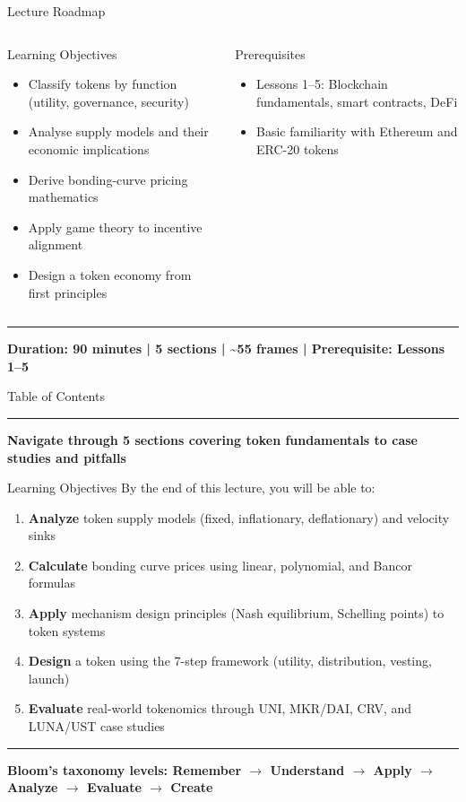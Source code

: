 \documentclass[8pt,aspectratio=169]{beamer}
\newcommand{\bottomnote}[1]{\vfill\vspace{-2mm}\textcolor{mllavender2}{\rule{\textwidth}{0.4pt}}\vspace{1mm}\footnotesize\textbf{#1}}
\begin{document}
\begin{frame}{Lecture Roadmap}
\begin{columns}[T]
\begin{block}{Learning Objectives}
\footnotesize
\begin{itemize}
  \item Classify tokens by function (utility, governance, security)
  \item Analyse supply models and their economic implications
  \item Derive bonding-curve pricing mathematics
  \item Apply game theory to incentive alignment
  \item Design a token economy from first principles
\end{itemize}
\end{block}
\vspace{1mm}
\begin{block}{Prerequisites}
\footnotesize
\begin{itemize}
  \item Lessons 1--5: Blockchain fundamentals, smart contracts, DeFi
  \item Basic familiarity with Ethereum and ERC-20 tokens
\end{itemize}
\end{block}
\end{columns}
\bottomnote{Duration: 90 minutes | 5 sections | \textasciitilde55 frames | Prerequisite: Lessons 1--5}
\end{frame}

\begin{frame}{Table of Contents}
\tableofcontents
\bottomnote{Navigate through 5 sections covering token fundamentals to case studies and pitfalls}
\end{frame}

\begin{frame}{Learning Objectives}
By the end of this lecture, you will be able to:
\begin{enumerate}
\item \textbf{Analyze} token supply models (fixed, inflationary, deflationary) and velocity sinks
\item \textbf{Calculate} bonding curve prices using linear, polynomial, and Bancor formulas
\item \textbf{Apply} mechanism design principles (Nash equilibrium, Schelling points) to token systems
\item \textbf{Design} a token using the 7-step framework (utility, distribution, vesting, launch)
\item \textbf{Evaluate} real-world tokenomics through UNI, MKR/DAI, CRV, and LUNA/UST case studies
\end{enumerate}
\bottomnote{Bloom's taxonomy levels: Remember $\rightarrow$ Understand $\rightarrow$ Apply $\rightarrow$ Analyze $\rightarrow$ Evaluate $\rightarrow$ Create}
\end{frame}
\end{document}
